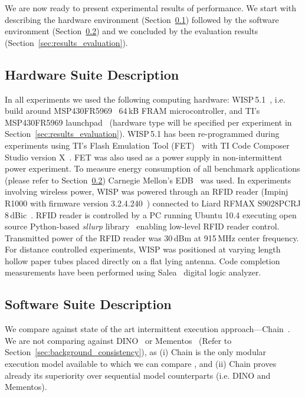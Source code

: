 We are now ready to present experimental results of \sys performance. We start with describing the hardware environment (Section~\ref{sec:results_hardware}) followed by the software environment (Section~\ref{sec:results_software}) and we concluded by the evaluation results (Section~\ref{sec:results_evaluation}).

\subsection{Hardware Suite Description}
\label{sec:results_hardware}

In all experiments we used the following computing hardware: WISP\,5.1~\cite{wisp5,wisp}, i.e. build around MSP430FR5969~\cite{wolverine} 64\,kB FRAM microcontroller, and TI's MSP430FR5969 launchpad~\cite{MSP-EXP430FR5969_launchpad} (hardware type will be specified per experiment in Section~\ref{sec:results_evaluation}). WISP\,5.1 has been re-programmed during experiments using TI's Flash Emulation Tool (FET)~\cite{fet} with TI Code Composer Studio version X~\cite{}. FET was also used as a power supply in non-intermittent power experiment. To measure energy consumption of all benchmark applications (please refer to Section~\ref{sec:results_software}) Carnegie Mellon's EDB~\cite{edb} was used. In experiments involving wireless power, WISP was powered through an RFID reader (Impinj R1000 with firmware version 3.2.4.240~\cite{r1000_data_sheet}) connected to Liard RFMAX S9028PCRJ 8\,dBic~\cite{atlas2015}. RFID reader is controlled by a PC running Ubuntu 10.4 executing open source Python-based \emph{sllurp} library~\cite{sllrp_github} enabling low-level RFID reader control. Transmitted power of the RFID reader was 30\,dBm at 915\,MHz center frequency. For distance controlled experiments, WISP was positioned at varying length hollow paper tubes placed directly on a flat lying antenna. Code completion measurements have been performed using Salea~\cite{saleae} digital logic analyzer.

\subsection{Software Suite Description}
\label{sec:results_software}

We compare \sys against state of the art intermittent execution approach---Chain~\cite{chain}. We are not comparing \sys against DINO~\cite{dino} or Mementos~\cite{mementos} (Refer to Section~\ref{sec:background_consistency}), as (i) Chain is the only modular execution model available to which we can compare \sys, and (ii) Chain proves already its superiority over sequential model counterparts (i.e. DINO and Mementos).

